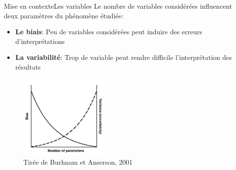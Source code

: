 \documentclass{eecslides}
\begin{document}
	\begin{frame}{Mise en contexte}{Les variables} 
	Le nombre de variables considérées influencent \alert{deux paramètres} du phénomène étudiée:
	\begin{itemize}
		\item \textbf{Le biais}: Peu de variables considérées peut induire des erreurs d'interprétations 
		\item \textbf{La variabilité}: Trop de variable peut rendre difficile l'interprétation des résultats
	\end{itemize}

		\begin{figure}
			\includegraphics[width=0.4\textwidth]{Ockam.jpg}
	         		 \caption*{\scriptsize{Tirée de Burhnam et Anserson, 2001}}
		\end{figure}
	\end{frame}
\end{document}
